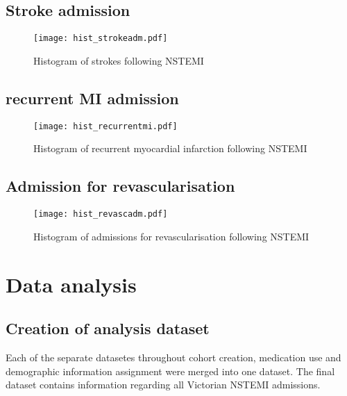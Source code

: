 \documentclass[11pt]{article}
\begin{document}
\subsection{Stroke admission}
\color{violet}
\begin{stlog}\end{stlog}
\color{black}
\begin{figure} [h]
	\centering
	\texttt{[image: hist\_strokeadm.pdf]}
	\caption{Histogram of strokes following NSTEMI}
	\label{stroke_cvd}
\end{figure}
\color{violet}
\begin{stlog}\end{stlog}
\color{black}
\subsection{recurrent MI admission}
\color{violet}
\begin{stlog}\end{stlog}
\color{black}
\begin{figure} [h]
	\centering
	\texttt{[image: hist\_recurrentmi.pdf]}
	\caption{Histogram of recurrent myocardial infarction following NSTEMI}
	\label{hist_recurrentmi}
\end{figure}

\subsection{Admission for revascularisation}
\color{violet}
\begin{stlog}\end{stlog}
\color{black}
\begin{figure} [h]
	\centering
	\texttt{[image: hist\_revascadm.pdf]}
	\caption{Histogram of admissions for revascularisation following NSTEMI}
	\label{hist_revascadm}
\end{figure}

\pagebreak
\section{Data analysis}
\subsection{Creation of analysis dataset}
Each of the separate datasetes throughout cohort creation, medication use and demographic information assignment were merged into one dataset. The final dataset contains information regarding all Victorian NSTEMI admissions.
\color{violet}
\begin{stlog}\end{stlog}
\color{black}
\pagebreak
\end{document}

